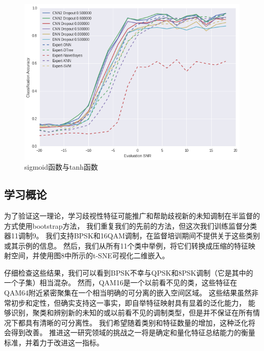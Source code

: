 \begin{figure}[!h]
	\centering
	\includegraphics[scale=0.3]{figures/chapter_3/result}
	\caption{sigmoid函数与tanh函数}\label{fig_2_2}
\end{figure}

\subsection{学习概论}
为了验证这一理论，学习歧视性特征可能推广和帮助歧视新的未知调制在半监督的方式使用bootstrap方法，
我们重复我们的先前的方法，但这次我们训练监督分类器11调制9。
我们支持BPSK和16QAM调制，在监督培训期间不提供关于这些类别或其示例的信息。
然后，我们从所有11个类中举例，将它们转换成压缩的特征映射空间，并使用图8中所示的t-SNE可视化二维嵌入。\par

仔细检查这些结果，我们可以看到BPSK不幸与QPSK和8PSK调制（它是其中的一个子集）相当混杂。
然而，QAM16是一个以前看不见的类，这些特征在QAM64附近紧密聚集在一个相当明确的可分离的嵌入空间区域。
这些结果虽然非常初步和定性，但确实支持这一事实，即自举特征映射具有显着的泛化能力，
能够识别，聚类和辨别新的未知的或以前看不见的调制类型，但是并不保证在所有情况下都具有清晰的可分离性。
我们希望随着类别和特征数量的增加，这种泛化将会得到改善。
推进这一研究领域的挑战之一将是确定和量化特征总结能力的衡量标准，并着力于改进这一指标。\par

